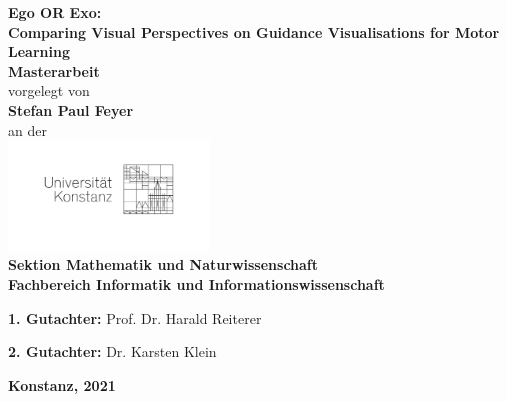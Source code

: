 \documentclass[11pt, paper=a4, parskip, twoside, open=right]{scrreprt}
\begin{document}
	\begin{titlepage}
		\begin{center}
			{\LARGE \textbf{Ego OR Exo:\\Comparing Visual Perspectives on Guidance Visualisations for Motor Learning}}
			\\[1cm]
			{\Large \textbf{Masterarbeit}}
			\\[1cm]
			{\Large vorgelegt von}
			\\[0.5cm]
			{\LARGE \textbf{Stefan Paul Feyer}}
			\\[0.5cm]
			{\Large an der}
			\\[0.5cm]
			\includegraphics[width=0.4\textwidth]{figures/unisignet.pdf}
			\\[1cm]
			{\Large \textbf{Sektion Mathematik und Naturwissenschaft}}
			\\[1cm]
			{\Large \textbf{Fachbereich Informatik und Informationswissenschaft}}
			\\[2cm]
			\begin{minipage}[c]{0.8\textwidth}
				\begin{description}[style=multiline]
					\item {\Large \textbf{1. Gutachter:} Prof. Dr. Harald Reiterer}
					\item {\Large \textbf{2. Gutachter:} Dr. Karsten Klein}
				\end{description}
			\end{minipage}
			\vfill
			{\LARGE \textbf{Konstanz, 2021}}
		\end{center}
	\end{titlepage}


\makeabstract
\tableofcontents
{} %
\listoffigures
{} %
\listoftables
{} %
\newpage
\thispagestyle{empty}
\ 
\clearpage
\setcounter{romanPages}{\value{page}} %
\pagenumbering{arabic} %
\end{document}
